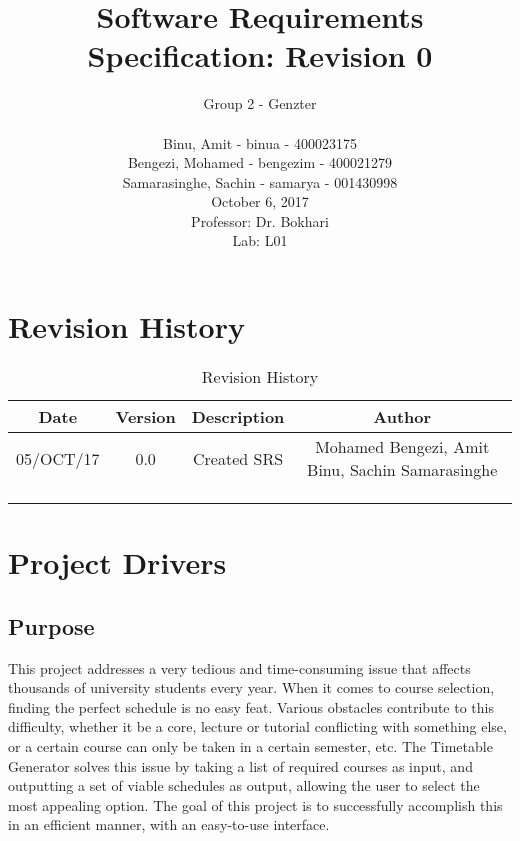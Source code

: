 \documentclass[12pt]{article}
\title{Software Requirements Specification: Revision 0}
\author{Group 2 - Genzter \\
		\\ Binu, Amit - binua - 400023175
		\\ Bengezi, Mohamed - bengezim - 400021279
		\\ Samarasinghe, Sachin - samarya - 001430998
		\\ October 6, 2017
		\\Professor: Dr. Bokhari
		\\ Lab: L01}
\begin{document}
\maketitle

\newpage

{\centering
  \tableofcontents\par
}

\newpage
\section{Revision History}
\begin{table}[h]
\begin{center}
\begin{tabular}{ | c | c | c | c | }
\hline
 Date & Version & Description & Author \\ 
\hline
 05/OCT/17 & 0.0 & Created SRS & Mohamed Bengezi, Amit Binu, Sachin Samarasinghe \\  
\hline
  & & & \\
\hline
 & & & \\
\hline 
 & & & \\ 
\hline 
\end{tabular}
\end{center}
\caption{Revision History}
\end{table}

\newpage
\section{Project Drivers}
\subsection{Purpose}
\tab This project addresses a very tedious and time-consuming issue that affects thousands of university students every year. When it comes to course selection, finding the perfect schedule is no easy feat. Various obstacles contribute to this difficulty, whether it be a core, lecture or tutorial conflicting with something else, or a certain course can only be taken in a certain semester, etc. The Timetable Generator solves this issue by taking a list of required courses as input, and outputting a set of viable schedules as output, allowing the user to select the most appealing option. The goal of this project is to successfully accomplish this in an efficient manner, with an easy-to-use interface.
\end{document}
